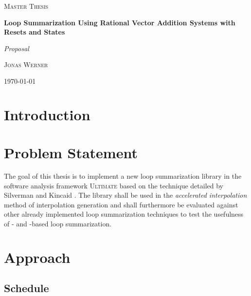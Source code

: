 \documentclass{article}
\begin{document}
\newcommand{\HorizontalLine}{\rule{\linewidth}{0.3mm}}

\begin{center}
	{\scshape\Large Master Thesis \par}
	\vspace{1.5cm}
	{\huge\bfseries Loop Summarization Using Rational Vector Addition Systems with Resets and States \par}
    {\huge \itshape Proposal \par}
	\vspace{1cm}
	{\large \scshape Jonas Werner\par}
	\vspace{0.5cm}
	{\today \vspace{2cm}}
\end{center}

\vspace*{2cm}

\section{Introduction}


\section{Problem Statement}
The goal of this thesis is to implement a new loop summarization library in the software analysis framework \textsc{Ultimate}\cite{Zitat02} based on the technique detailed by Silverman and Kincaid \cite{10.1007/978-3-030-25543-5_7}. The library shall be used in the \textsl{accelerated interpolation} method of interpolation generation and shall furthermore be evaluated against other already implemented loop summarization techniques to test the usefulness of \qvasr- and \qvasrs-based loop summarization.
\section{Approach}


\begin{landscape}
\section{Schedule}


\end{landscape}



\pagebreak
{}


\end{document}

